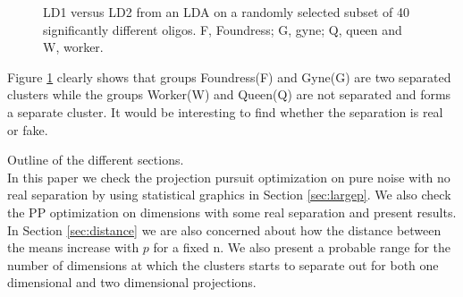 \documentclass[12]{article}
\begin{document}
\begin{figure}[hbtp]
   \centering
       \caption{LD1 versus LD2 from an LDA on a randomly selected subset of 40 significantly different oligos. F, Foundress; G, gyne; Q, queen and W, worker.}
     \label{oligo}
\end{figure}  

\newpage

Figure \ref{oligo} clearly shows that groups Foundress(F) and Gyne(G) are two separated clusters while the groups Worker(W) and Queen(Q) are not separated and forms a separate cluster. It would be interesting to find whether the separation is real or fake.

{\color{red} Outline of the different sections.}\\
In this paper we check the projection pursuit optimization on pure noise with no real separation by using statistical graphics in Section \ref{sec:largep}. We also check the PP optimization on dimensions with some real separation and present results. In Section  \ref{sec:distance} we are also concerned about how the distance between the means increase with $p$ for a fixed n. We also present a probable range for the number of dimensions at which the clusters starts to separate out for both one dimensional and two dimensional projections.
\end{document}
